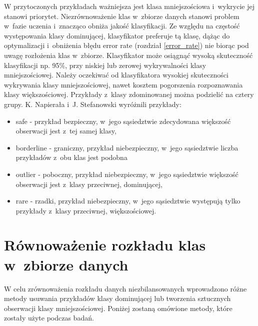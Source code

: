 W przytoczonych przykładach ważniejsza jest klasa mniejszościowa i~wykrycie jej stanowi priorytet. Niezrównoważenie klas w zbiorze danych stanowi problem w fazie uczenia i znacząco obniża jakość klasyfikacji. Ze względu na częstość występowania klasy dominującej, klasyfikator preferuje tą klasę, dążąc do optymalizacji i~obniżenia błędu error rate (rozdział \ref{error_rate}) nie biorąc pod uwagę rozłożenia klas w~zbiorze. Klasyfikator może osiągnąć wysoką skuteczność klasyfikacji np. 95\%, przy niskiej lub zerowej wykrywalności klasy mniejszościowej. 
Należy oczekiwać od klasyfikatora wysokiej skuteczności wykrywania klasy mniejszościowej, nawet kosztem pogorszenia rozpoznawania klasy większościowej.
Przykłady z~klasy zdominowanej można podzielić na cztery grupy. K. Napierała i~J. Stefanowski wyróżnili przykłady\cite{przykladyklas}:
\begin{itemize}
	\item safe - przykład bezpieczny, w~jego sąsiedztwie zdecydowana większość obserwacji jest z~tej samej klasy,
	\item borderline - graniczny, przykład niebezpieczny, w~jego sąsiedztwie liczba przykładów z~obu klas jest podobna
	\item outlier - poboczny, przykład niebezpieczny, w~jego sąsiedztwie większość obserwacji jest z~klasy przeciwnej, dominującej,
	\item rare - rzadki, przykład niebezpieczny, w~jego sąsiedztwie występują tylko przykłady z~klasy przeciwnej, większościowej.
\end{itemize}

\section{Równoważenie rozkładu klas w~zbiorze danych}
\label{rozdzialopissamplingu}
W celu zrównoważenia rozkładu danych niezbilansowanych wprowadzono różne metody usuwania przykładów klasy dominującej lub tworzenia sztucznych obserwacji klasy mniejszościowej. Poniżej zostaną omówione metody, które zostały użyte podczas badań.
